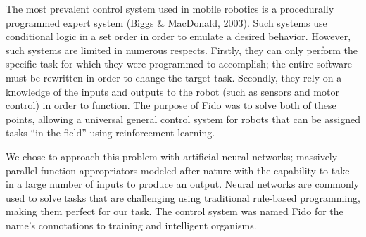 The most prevalent control system used in mobile robotics is a procedurally programmed expert system (Biggs \& MacDonald, 2003).  Such systems use conditional logic in a set order in order to emulate a desired behavior.  However, such systems are limited in numerous respects.  Firstly, they can only perform the specific task for which they were programmed to accomplish; the entire software must be rewritten in order to change the target task.  Secondly, they rely on a knowledge of the inputs and outputs to the robot (such as sensors and motor control) in order to function.  The purpose of Fido was to solve both of these points, allowing a universal general control system for robots that can be assigned tasks ``in the field'' using reinforcement learning.  

We chose to approach this problem with artificial neural networks; massively parallel function appropriators modeled after nature with the capability to take in a large number of inputs to produce an output.  Neural networks are commonly used to solve tasks that are challenging using traditional rule-based programming, making them perfect for our task.  The control system was named Fido for the name's connotations to training and intelligent organisms. 